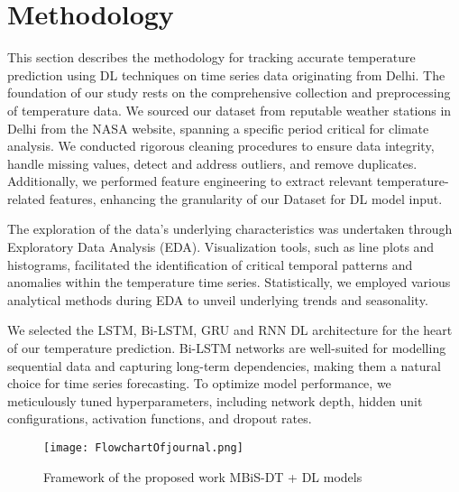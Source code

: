 
\chapter{Methodology} %

\label{c4} %


 
This section describes the methodology for tracking accurate temperature prediction using DL techniques on time series data originating from Delhi. The foundation of our study rests on the comprehensive collection and preprocessing of temperature data. We sourced our dataset from reputable weather stations in Delhi from the NASA website, spanning a specific period critical for climate analysis. We conducted rigorous cleaning procedures to ensure data integrity, handle missing values, detect and address outliers, and remove duplicates. Additionally, we performed feature engineering to extract relevant temperature-related features, enhancing the granularity of our Dataset for DL model input.

The exploration of the data's underlying characteristics was undertaken through Exploratory Data Analysis (EDA). Visualization tools, such as line plots and histograms, facilitated the identification of critical temporal patterns and anomalies within the temperature time series. Statistically, we employed various analytical methods during EDA to unveil underlying trends and seasonality.

We selected the LSTM, Bi-LSTM, GRU and RNN DL architecture for the heart of our temperature prediction. Bi-LSTM networks are well-suited for modelling sequential data and capturing long-term dependencies, making them a natural choice for time series forecasting. To optimize model performance, we meticulously tuned hyperparameters, including network depth, hidden unit configurations, activation functions, and dropout rates.



\begin{figure}[ht!]
\centering
\texttt{[image: FlowchartOfjournal.png]}
\caption{Framework of the proposed work MBiS-DT + DL models}
\label{fig:Flowchart Of Proposed Work}
\end{figure}
